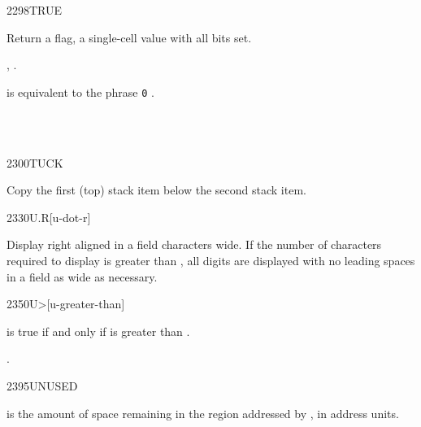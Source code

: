 \begin{worddef}{2298}{TRUE}
\item {}

	Return a  flag, a single-cell value with all
	bits set.

\see {},
	.

	\begin{rationale} %
		 is equivalent to the phrase
		\texttt{0} .
	\end{rationale}

	\begin{testing}
	 \\
	 \\
	\end{testing}
\end{worddef}


\begin{worddef}{2300}{TUCK}
\item {}

	Copy the first (top) stack item below the second stack item.
\end{worddef}


\begin{worddef}{2330}{U.R}[u-dot-r]
\item {}

	Display  right aligned in a field  characters
	wide. If the number of characters required to display 
	is greater than , all digits are displayed with no leading
	spaces in a field as wide as necessary.
\end{worddef}


\begin{worddef}[Umore]{2350}{U>}[u-greater-than]
\item {}

	 is true if and only if  is greater than
	.

\see {}.
\end{worddef}


\begin{worddef}{2395}{UNUSED}
\item {}

	 is the amount of space remaining in the region addressed
	by , in address units.
\end{worddef}


